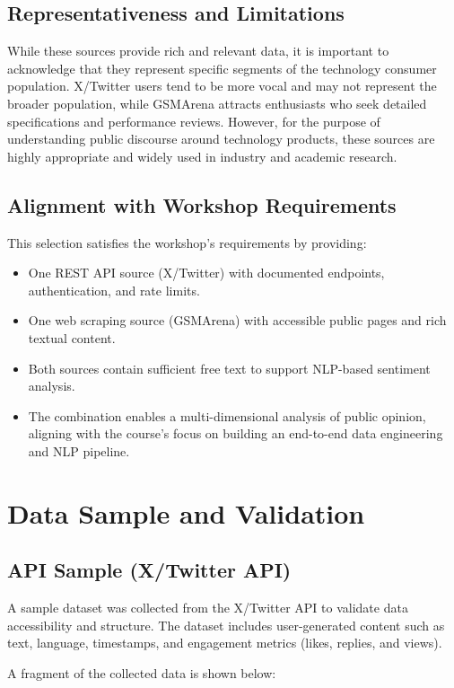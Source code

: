 \documentclass[12pt]{article}
\begin{document}
\subsection{Representativeness and Limitations}
While these sources provide rich and relevant data, it is important to acknowledge that they represent specific segments of the technology consumer population. X/Twitter users tend to be more vocal and may not represent the broader population, while GSMArena attracts enthusiasts who seek detailed specifications and performance reviews. However, for the purpose of understanding public discourse around technology products, these sources are highly appropriate and widely used in industry and academic research.

\subsection{Alignment with Workshop Requirements}
This selection satisfies the workshop's requirements by providing:
\begin{itemize}
\item One REST API source (X/Twitter) with documented endpoints, authentication, and rate limits.
\item One web scraping source (GSMArena) with accessible public pages and rich textual content.
\item Both sources contain sufficient free text to support NLP-based sentiment analysis.
\item The combination enables a multi-dimensional analysis of public opinion, aligning with the course's focus on building an end-to-end data engineering and NLP pipeline.
\end{itemize}

\section{Data Sample and Validation}

\subsection{API Sample (X/Twitter API)}
A sample dataset was collected from the X/Twitter API to validate data accessibility and structure. The dataset includes user-generated content such as text, language, timestamps, and engagement metrics (likes, replies, and views).

A fragment of the collected data is shown below:
\end{document}
